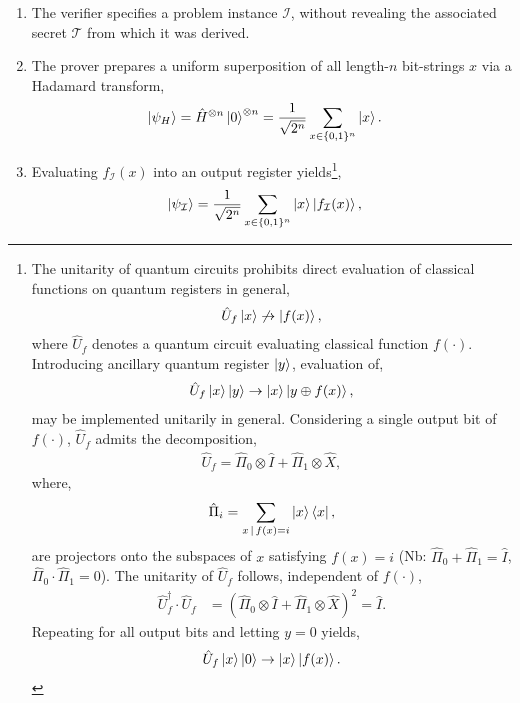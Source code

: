 \documentclass[twocolumn, aps, amsmath, amssymb, nofootinbib, superscriptaddress, longbibliography, floatfix, eqsecnum, rmp]{revtex4-2}
\begin{document}
\begin{enumerate}
	\item The verifier specifies a problem instance $\mathcal{I}$, without revealing the associated secret $\mathcal{T}$ from which it was derived.
	\item The prover prepares a uniform superposition of all length-$n$ bit-strings $x$ via a Hadamard transform,
\begin{align}
	\ket{\psi_H} &= \hat{H}^{\otimes n} \ket{0}^{\otimes n} = \frac{1}{\sqrt{2^n}} \sum_{x\in\{0,1\}^n} \ket{x}.
\end{align}
	\item Evaluating $f_\mathcal{I}(x)$ into an output register yields\footnote{The unitarity of quantum circuits prohibits direct evaluation of classical functions on quantum registers in general,
	\begin{align}
		\hat{U}_f\ket{x}\not\to\ket{f(x)},\nonumber
	\end{align}
	where $\hat{U}_f$ denotes a quantum circuit evaluating classical function $f(\cdot)$. Introducing ancillary quantum register $\ket{y}$, evaluation of,
	\begin{align}
		\hat{U}_f\ket{x}\ket{y}\to\ket{x}\ket{y\oplus f(x)},\nonumber
	\end{align}
	may be implemented unitarily in general. Considering a single output bit of $f(\cdot)$, $\hat{U}_f$ admits the decomposition,
	\begin{align}
		\hat{U}_f = \hat\Pi_0\otimes \hat{I} + \hat\Pi_1\otimes \hat{X},\nonumber
		\end{align}
	where,
	\begin{align}
		\hat\Pi_i = \sum_{x\,|\,f(x)=i}\ket{x}\bra{x},\nonumber
	\end{align}
	are projectors onto the subspaces of $x$ satisfying \mbox{$f(x)=i$} (Nb: \mbox{$\hat\Pi_0+\hat\Pi_1=\hat{I}$}, \mbox{$\hat\Pi_0\cdot\hat\Pi_1=0$}). The unitarity of $\hat{U}_f$ follows, independent of $f(\cdot)$,
	\begin{align}
		\hat{U}_f^\dag \cdot \hat{U}_f &= (\hat\Pi_{0}\otimes \hat{I} + \hat\Pi_1\otimes \hat{X})^2 = \hat{I}.\nonumber
	\end{align}
	Repeating for all output bits and letting \mbox{$y=0$} yields,
	\begin{align}
		\hat{U}_f\ket{x}\ket{0}\to\ket{x}\ket{f(x)}.\nonumber
	\end{align}},
	\begin{align}
		\ket{\psi_\mathcal{I}} &= \frac{1}{\sqrt{2^n}} \sum_{x\in\{0,1\}^n} \ket{x} \ket{f_\mathcal{I}(x)},\nonumber

\end{align}
\end{enumerate}
\end{document}
